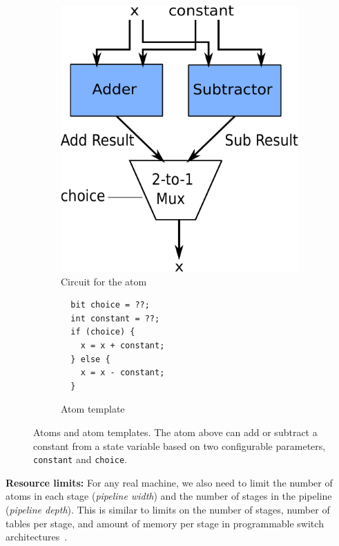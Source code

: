 \begin{figure}[h]
  \begin{subfigure}{0.4\columnwidth}
  \includegraphics[width=\textwidth]{circuit.pdf}
  \caption{Circuit for the atom}
  \label{fig:alu_diag}
  \end{subfigure}
  \hspace{0.05\columnwidth}
  \begin{subfigure}{0.55\columnwidth}
  \begin{lstlisting}
  bit choice = ??;
  int constant = ??;
  if (choice) {
    x = x + constant;
  } else {
    x = x - constant;
  }
  \end{lstlisting}
  \caption{Atom template}
  \label{fig:alu_in_sketch}
  \end{subfigure}
  \caption{Atoms and atom templates. The atom above can add or subtract a constant from a state
  variable based on two configurable parameters, {\tt constant} and {\tt choice}.}
  \label{fig:atom}
\end{figure}

\textbf{Resource limits:} For any real machine, we also need to limit the
number of atoms in each stage (\textit{pipeline width}) and the number of
stages in the pipeline (\textit{pipeline depth}). This is similar to limits on
the number of stages, number of tables per stage, and amount of memory per
stage in programmable switch architectures~\cite{lavanya_compiler}.

